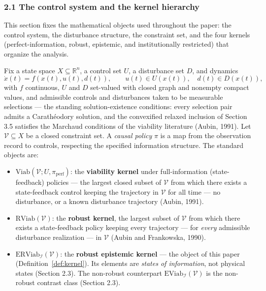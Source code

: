 \documentclass[10pt,twocolumn]{article}
\theoremstyle{definition}
\providecommand{\tightlist}{\setlength{\itemsep}{0pt}\setlength{\parskip}{0pt}}
\begin{document}
\subsubsection{2.1 The control system and the kernel
hierarchy}\label{the-control-system-and-the-kernel-hierarchy}

This section fixes the mathematical objects used throughout the paper:
the control system, the disturbance structure, the constraint set, and
the four kernels (perfect-information, robust, epistemic, and
institutionally restricted) that organize the analysis.

Fix a state space \(X \subseteq \mathbb{R}^n\), a control set \(U\), a
disturbance set \(D\), and dynamics
\[\dot x(t) = f(x(t), u(t), d(t)), \qquad u(t) \in U(x(t)), \quad d(t) \in D(x(t)),\]
with \(f\) continuous, \(U\) and \(D\) set-valued with closed graph and
nonempty compact values, and admissible controls and disturbances taken
to be measurable selections --- the standing solution-existence conditions:
every selection pair admits a Carath\'eodory solution, and the
convexified relaxed inclusion of Section 3.5 satisfies the Marchaud
conditions of the viability literature (Aubin, 1991). Let \(\mathcal{V} \subseteq X\) be a closed
constraint set. A \emph{causal policy} \(\pi\) is a map from the
observation record to controls, respecting the specified information structure. The standard objects are:

\begin{itemize}
\tightlist
\item
  \(\mathrm{Viab}(\mathcal{V}; U, \pi_{\mathrm{perf}})\): the
  \textbf{viability kernel} under full-information (state-feedback)
  policies --- the largest closed subset of \(\mathcal{V}\) from which
  there exists a state-feedback control keeping the trajectory in
  \(\mathcal{V}\) for all time --- no disturbance, or a known
  disturbance trajectory (Aubin, 1991).
\item
  \(\mathrm{RViab}(\mathcal{V})\): the \textbf{robust kernel}, the
  largest subset of \(\mathcal{V}\) from which there exists a
  state-feedback policy keeping every trajectory --- for \emph{every}
  admissible disturbance realization --- in \(\mathcal{V}\) (Aubin and
  Frankowska, 1990).
\item
  \(\mathrm{ERViab}_{\mathcal{I}}(\mathcal{V})\): the \textbf{robust
  epistemic kernel} --- the object of this paper (Definition~\ref{def:kernel}). Its
  elements are \emph{states of information}, not physical states
  (Section 2.3). The non-robust counterpart
  \(\mathrm{EViab}_{\mathcal{I}}(\mathcal{V})\) is the non-robust contrast class (Section 2.3).
\end{itemize}
\end{document}
